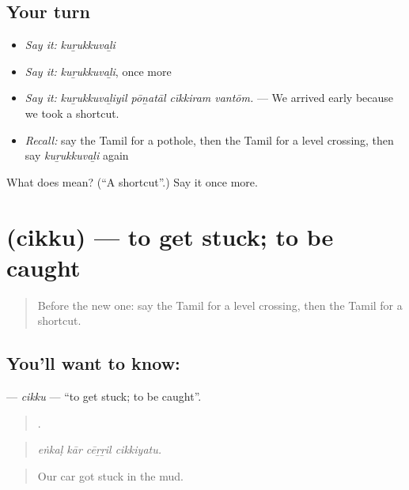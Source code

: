 \subsection*{Your turn}
\begin{itemize}
\raggedright
  \item \emph{Say it:} \emph{kuṟukkuvaḻi}
  \item \emph{Say it:} \emph{kuṟukkuvaḻi}, once more
  \item \emph{Say it:} \emph{kuṟukkuvaḻiyil pōṉatāl cīkkiram vantōm.} — We arrived early because we took a shortcut.
  \item \emph{Recall:} say the Tamil for a pothole, then the Tamil for a level crossing, then say \emph{kuṟukkuvaḻi} again
\end{itemize}

\begin{tcolorbox}[breakable,colback=teal!4,colframe=teal!35!black,title={Before you move on}]
What does  mean? (\textquotedblleft{}A shortcut\textquotedblright{}.) Say it once more.
\end{tcolorbox}
\section[\texorpdfstring{\ta{சிக்கு} (cikku)}{சிக்கு (cikku)}]{ (cikku) — to get stuck; to be caught}

\label{lesson:TA-C409-cikku}



\begin{quote}
Before the new one: say the Tamil for a level crossing, then the Tamil for a shortcut.
\end{quote}

\subsection*{You'll want to know: }
\textbf{} — \emph{cikku} — \textquotedblleft{}to get stuck; to be caught\textquotedblright{}.

\begin{quote}
   .
\end{quote}

\begin{quote}
\emph{eṅkaḷ kār cēṟṟil cikkiyatu.}
\end{quote}

\begin{quote}
Our car got stuck in the mud.
\end{quote}

